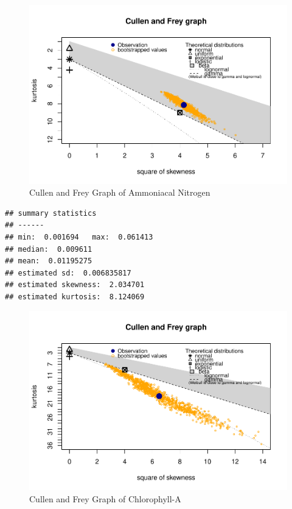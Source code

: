 \documentclass[
]{article}
\begin{document}
\begin{figure}
\centering
\includegraphics{Final-Report_files/figure-latex/cfNH4N-1.pdf}
\caption{\label{fig:cfNH4N}Cullen and Frey Graph of Ammoniacal Nitrogen}
\end{figure}

\begin{verbatim}
## summary statistics
## ------
## min:  0.001694   max:  0.061413 
## median:  0.009611 
## mean:  0.01195275 
## estimated sd:  0.006835817 
## estimated skewness:  2.034701 
## estimated kurtosis:  8.124069
\end{verbatim}

\begin{figure}
\centering
\includegraphics{Final-Report_files/figure-latex/cfCHLA-1.pdf}
\caption{\label{fig:cfCHLA}Cullen and Frey Graph of Chlorophyll-A}
\end{figure}
\end{document}

